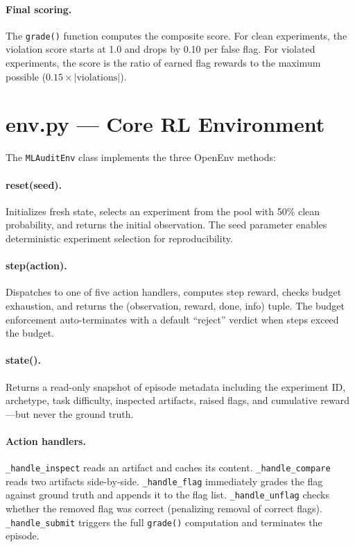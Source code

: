 \documentclass{article}
\begin{document}
\paragraph{Final scoring.}
The \texttt{grade()} function computes the composite score.  For clean
experiments, the violation score starts at 1.0 and drops by 0.10 per
false flag.  For violated experiments, the score is the ratio of earned
flag rewards to the maximum possible ($0.15 \times |\text{violations}|$).

\section{env.py --- Core RL Environment}

The \texttt{MLAuditEnv} class implements the three OpenEnv methods:

\paragraph{reset(seed).}
Initializes fresh state, selects an experiment from the pool with 50\%
clean probability, and returns the initial observation.  The seed parameter
enables deterministic experiment selection for reproducibility.

\paragraph{step(action).}
Dispatches to one of five action handlers, computes step reward, checks
budget exhaustion, and returns the (observation, reward, done, info) tuple.
The budget enforcement auto-terminates with a default ``reject'' verdict
when steps exceed the budget.

\paragraph{state().}
Returns a read-only snapshot of episode metadata including the experiment
ID, archetype, task difficulty, inspected artifacts, raised flags, and
cumulative reward---but never the ground truth.

\paragraph{Action handlers.}
\texttt{\_handle\_inspect} reads an artifact and caches its content.
\texttt{\_handle\_compare} reads two artifacts side-by-side.
\texttt{\_handle\_flag} immediately grades the flag against ground truth
and appends it to the flag list.  \texttt{\_handle\_unflag} checks whether
the removed flag was correct (penalizing removal of correct flags).
\texttt{\_handle\_submit} triggers the full \texttt{grade()} computation
and terminates the episode.
\end{document}
